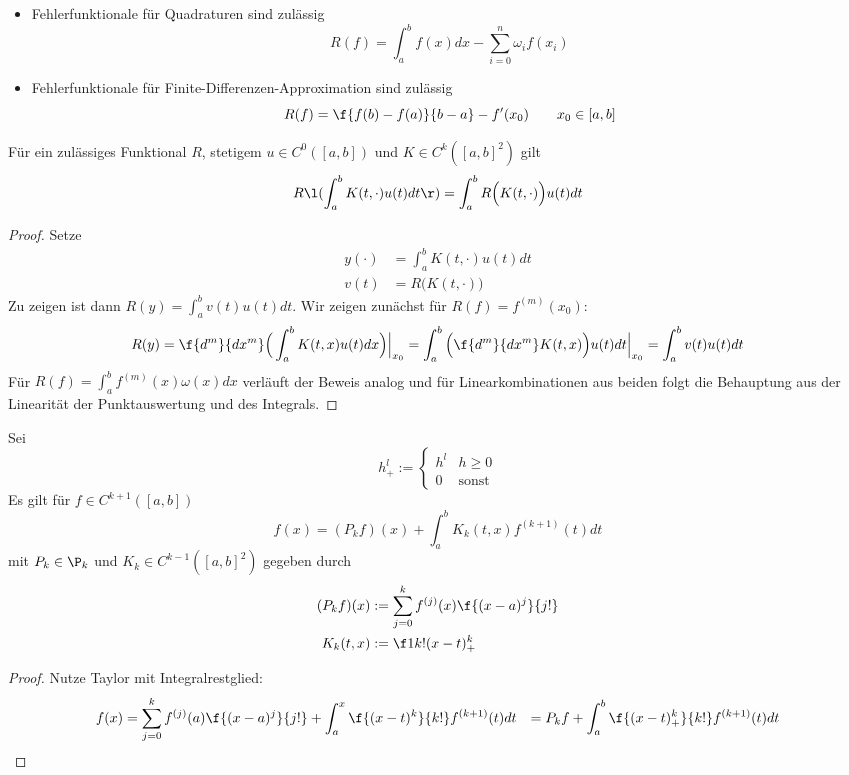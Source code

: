 \documentclass[11pt]{scrartcl}
\begin{document}
\begin{ex*}
	\begin{itemize}
		\item
			Fehlerfunktionale für Quadraturen sind zulässig
			\[
				R(f) = \int_a^b f(x) dx - \sum_{i=0}^n \omega_i f(x_i)
			\]
		\item
			Fehlerfunktionale für Finite-Differenzen-Approximation sind zulässig
			\[
				R(f) = \f {f(b)-f(a)}{b-a} - f'(x_0) \qquad x_0\in [a,b]
			\]
	\end{itemize}
\end{ex*}

\begin{lem}[Vertauschungsregel]
	\label{2.28}	
	Für ein zulässiges Funktional $R$, stetigem $u\in C^0([a,b])$ und $K\in C^k([a,b]^2)$ gilt
	\[
		R\l( \int_a^b K(t,\cdot) u(t) dt \r) 
		= \int_a^b R\Big(K(t,\cdot)\Big) u(t) dt
	\]
	\begin{proof}
		Setze
		\begin{align*}
			y(\cdot) &= \int_a^b K(t,\cdot) u(t) dt \\
			v(t) &= R\big(K(t,\cdot)\big)
		\end{align*}
		Zu zeigen ist dann $R(y) = \int_a^b v(t) u(t) dt$.
		Wir zeigen zunächst für $R(f) = f^{(m)}(x_0)$:
		\begin{align*}
			R(y) = \f {d^m}{dx^m} \Big( \int_a^b K(t,x) u(t) dx \Big) \Big|_{x_0}
			= \int_a^b \Big( \f {d^m}{dx^m} K(t,x) \Big) u(t) dt \Big|_{x_0}
			= \int_a^b v(t) u(t) dt
		\end{align*}
		Für $R(f) = \int_a^b f^{(m)}(x) \omega(x) dx$ verläuft der Beweis analog und für Linearkombinationen aus beiden folgt die Behauptung aus der Linearität der Punktauswertung und des Integrals.
	\end{proof}
\end{lem}

\begin{lem}
	\label{2.29}
	Sei 
	\[
		h_+^l := \begin{cases}h^l & h\ge 0 \\ 0 & \text{sonst}\end{cases}
	\]
	Es gilt für $f\in C^{k+1}([a,b])$
	\[
		f(x) = (P_kf)(x) + \int_a^b K_k(t,x) f^{(k+1)}(t) dt
	\]
	mit $P_k \in \P_k$ und $K_k \in C^{k-1}([a,b]^2)$ gegeben durch
	\begin{align*}
		(P_kf)(x) &:= \sum_{j=0}^k f^{(j)}(x) \f {(x-a)^j}{j!} \\
		K_k(t,x) &:= \f 1{k!}(x-t)^k_+
	\end{align*}
	\begin{proof}
		Nutze Taylor mit Integralrestglied:
		\begin{align*}
			f(x) &= \sum_{j=0}^k f^{(j)}(a) \f {(x-a)^j}{j!} + \int_a^x \f {(x-t)^k}{k!} f^{(k+1)}(t) dt
			&= P_k f + \int_a^b \f {(x-t)^k_+}{k!} f^{(k+1)} (t) dt
		\end{align*}
	\end{proof}
\end{lem}
\end{document}
